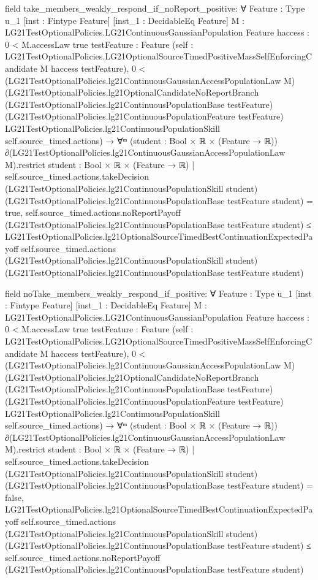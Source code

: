 \documentclass[10pt]{article}
\begin{document}
\begin{ReviewVerbatim}
field take_members_weakly_respond_if_noReport_positive:
∀ {Feature : Type u_1} [inst : Fintype Feature] [inst_1 : DecidableEq Feature]
  {M : LG21TestOptionalPolicies.LG21ContinuousGaussianPopulation Feature} {haccess : 0 < M.accessLaw {true}}
  {testFeature : Feature}
  (self : LG21TestOptionalPolicies.LG21OptionalSourceTimedPositiveMassSelfEnforcingCandidate M haccess testFeature),
  0 <
      (LG21TestOptionalPolicies.lg21ContinuousGaussianAccessPopulationLaw M)
        (LG21TestOptionalPolicies.lg21OptionalCandidateNoReportBranch
          (LG21TestOptionalPolicies.lg21ContinuousPopulationBase testFeature)
          (LG21TestOptionalPolicies.lg21ContinuousPopulationFeature testFeature)
          LG21TestOptionalPolicies.lg21ContinuousPopulationSkill self.source_timed.actions) →
    ∀ᵐ (student :
      Bool ×
        ℝ ×
          (Feature →
            ℝ)) ∂(LG21TestOptionalPolicies.lg21ContinuousGaussianAccessPopulationLaw M).restrict
        {student : Bool × ℝ × (Feature → ℝ) |
          self.source_timed.actions.takeDecision (LG21TestOptionalPolicies.lg21ContinuousPopulationSkill student)
              (LG21TestOptionalPolicies.lg21ContinuousPopulationBase testFeature student) =
            true},
      self.source_timed.actions.noReportPayoff
          (LG21TestOptionalPolicies.lg21ContinuousPopulationBase testFeature student) ≤
        LG21TestOptionalPolicies.lg21OptionalSourceTimedBestContinuationExpectedPayoff self.source_timed.actions
          (LG21TestOptionalPolicies.lg21ContinuousPopulationSkill student)
          (LG21TestOptionalPolicies.lg21ContinuousPopulationBase testFeature student)

field noTake_members_weakly_respond_if_positive:
∀ {Feature : Type u_1} [inst : Fintype Feature] [inst_1 : DecidableEq Feature]
  {M : LG21TestOptionalPolicies.LG21ContinuousGaussianPopulation Feature} {haccess : 0 < M.accessLaw {true}}
  {testFeature : Feature}
  (self : LG21TestOptionalPolicies.LG21OptionalSourceTimedPositiveMassSelfEnforcingCandidate M haccess testFeature),
  0 <
      (LG21TestOptionalPolicies.lg21ContinuousGaussianAccessPopulationLaw M)
        (LG21TestOptionalPolicies.lg21OptionalCandidateNoReportBranch
          (LG21TestOptionalPolicies.lg21ContinuousPopulationBase testFeature)
          (LG21TestOptionalPolicies.lg21ContinuousPopulationFeature testFeature)
          LG21TestOptionalPolicies.lg21ContinuousPopulationSkill self.source_timed.actions) →
    ∀ᵐ (student :
      Bool ×
        ℝ ×
          (Feature →
            ℝ)) ∂(LG21TestOptionalPolicies.lg21ContinuousGaussianAccessPopulationLaw M).restrict
        {student : Bool × ℝ × (Feature → ℝ) |
          self.source_timed.actions.takeDecision (LG21TestOptionalPolicies.lg21ContinuousPopulationSkill student)
              (LG21TestOptionalPolicies.lg21ContinuousPopulationBase testFeature student) =
            false},
      LG21TestOptionalPolicies.lg21OptionalSourceTimedBestContinuationExpectedPayoff self.source_timed.actions
          (LG21TestOptionalPolicies.lg21ContinuousPopulationSkill student)
          (LG21TestOptionalPolicies.lg21ContinuousPopulationBase testFeature student) ≤
        self.source_timed.actions.noReportPayoff
          (LG21TestOptionalPolicies.lg21ContinuousPopulationBase testFeature student)


\end{ReviewVerbatim}
\end{document}
